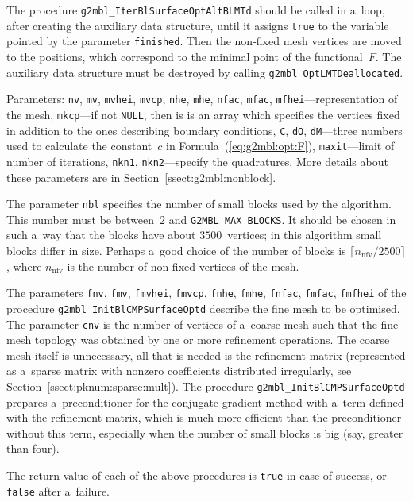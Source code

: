 The procedure \texttt{g2mbl\_IterBlSurfaceOptAltBLMTd} should be called in
a~loop, after creating the auxiliary data structure, until it
assigns \texttt{true} to the variable pointed by the parameter
\texttt{finished}. Then the non-fixed mesh vertices are moved to the
positions, which correspond to the minimal point of the functional~$F$.
The auxiliary data structure must be destroyed by calling
\texttt{g2mbl\_OptLMTDeallocated}.

Parameters: \texttt{nv}, \texttt{mv}, \texttt{mvhei}, \texttt{mvcp},
\texttt{nhe}, \texttt{mhe}, \texttt{nfac}, \texttt{mfac},
\texttt{mfhei}---representation of the mesh, \texttt{mkcp}---if not
\texttt{NULL}, then is is an array which specifies the vertices fixed in
addition to the ones describing boundary conditions, \texttt{C},
\texttt{dO}, \texttt{dM}---three numbers used to calculate the constant~$c$
in Formula~(\ref{eq:g2mbl:opt:F}), \texttt{maxit}---limit of number of
iterations, \texttt{nkn1}, \texttt{nkn2}---specify the quadratures.
More details about these parameters are in
Section~\ref{ssect:g2mbl:nonblock}.

The parameter \texttt{nbl} specifies the number of small blocks used by the
algorithm. This number must be between~$2$ and \texttt{G2MBL\_MAX\_BLOCKS}.
It should be chosen in such a~way that the blocks have about
$3500$~vertices; in this algorithm small blocks differ in size. Perhaps
a~good choice of the number of blocks is $\lceil n_{\mathrm{nfv}}/2500\rceil$,
where $n_{\mathrm{nfv}}$ is the number of non-fixed vertices of the mesh.

The parameters \texttt{fnv}, \texttt{fmv}, \texttt{fmvhei}, \texttt{fmvcp},
\texttt{fnhe}, \texttt{fmhe}, \texttt{fnfac}, \texttt{fmfac},
\texttt{fmfhei} of the procedure \texttt{g2mbl\_InitBlCMPSurfaceOptd}
describe the fine mesh to be optimised. The parameter \texttt{cnv} is the
number of vertices of a~coarse mesh such that the fine mesh topology was
obtained by one or more refinement operations. The coarse mesh itself is
unnecessary, all that is needed is the refinement matrix (represented as
a~sparse matrix with nonzero coefficients distributed irregularly, see
Section~\ref{ssect:pknum:sparse:mult}). The procedure
\texttt{g2mbl\_InitBlCMPSurfaceOptd} prepares a~preconditioner for the
conjugate gradient method with a~term defined with the refinement matrix,
which is much more efficient than the preconditioner without this term,
especially when the number of small blocks is big (say, greater than four).

The return value of each of the above procedures is \texttt{true} in case of
success, or \texttt{false} after a~failure.

